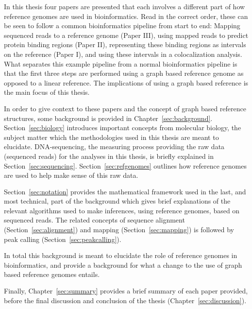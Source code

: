 In this thesis four papers are presented that each involves a different part of how reference genomes are used in bioinformatics.
Read in the correct order, these can be seen to follow a common bioinformatics pipeline from start to end: Mapping sequenced reads to a reference genome (Paper III), using mapped reads to predict protein binding regions (Paper II), representing these binding regions as intervals on the reference (Paper I), and using these intervals in a colocalization analysis.
What separates this example pipeline from a normal bioinformatics pipeline is that the first three steps are performed using a graph based reference genome as opposed to a linear reference.
The implications of using a graph based reference is the main focus of this thesis.

In order to give context to these papers and the concept of graph based reference structures, some background is provided in Chapter~\ref{sec:background}.
Section~\ref{sec:biology} introduces important concepts from molecular biology, the subject matter which the methodologies used in this thesis are meant to elucidate.
DNA-sequencing, the measuring process providing the raw data (sequenced reads) for the analyses in this thesis, is briefly explained in Section~\ref{sec:sequencing}.
Section~\ref{sec:refgenomes} outlines how reference genomes are used to help make sense of this raw data.

Section~\ref{sec:notation} provides the mathematical framework used in the last, and most technical, part of the background which gives brief explanations of the relevant algorithms used to make inferences, using reference genomes, based on sequenced reads.
The related concepts of sequence alignment (Section~\ref{sec:alignment}) and mapping (Section~\ref{sec:mapping}) is followed by peak calling (Section~\ref{sec:peakcalling}).

In total this background is meant to elucidate the role of reference genomes in bioinformatics, and provide a background for what a change to the use of graph based reference genomes entails.

Finally, Chapter~\ref{sec:summary} provides a brief summary of each paper provided, before the final discussion and conclusion of the thesis (Chapter~\ref{sec:discussion}).


